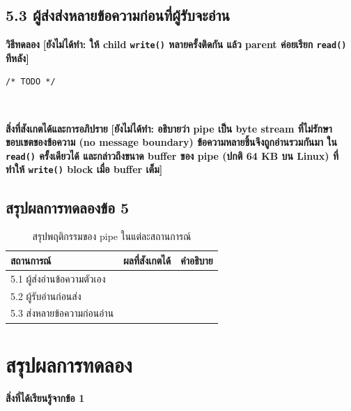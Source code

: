 \documentclass[a4paper,12pt]{article}
\newcommand{\code}[1]{\texttt{#1}}
\newcommand{\todo}[1]{\textcolor{todored}{\textbf{[ยังไม่ได้ทำ: #1]}}}
\begin{document}
\subsection{5.3 ผู้ส่งส่งหลายข้อความก่อนที่ผู้รับจะอ่าน}

\textbf{วิธีทดลอง} \quad \todo{ให้ child \code{write()} หลายครั้งติดกัน
แล้ว parent ค่อยเรียก \code{read()} ทีหลัง}

\begin{lstlisting}[caption={ส่วนของโค้ดที่แก้ไขในข้อ 5.3}]
/* TODO */
\end{lstlisting}

\begin{lstlisting}[style=terminal,caption={ผลลัพธ์ของข้อ 5.3}]


\end{lstlisting}

\textbf{สิ่งที่สังเกตได้และการอภิปราย} \quad \todo{อธิบายว่า pipe เป็น byte stream
ที่ไม่รักษาขอบเขตของข้อความ (no message boundary) ข้อความหลายชิ้นจึงถูกอ่านรวมกันมา
ใน \code{read()} ครั้งเดียวได้ และกล่าวถึงขนาด buffer ของ pipe (ปกติ 64 KB บน Linux)
ที่ทำให้ \code{write()} block เมื่อ buffer เต็ม}

\subsection{สรุปผลการทดลองข้อ 5}

\begin{table}[H]
\centering
\caption{สรุปพฤติกรรมของ pipe ในแต่ละสถานการณ์}
\begin{tabular}{p{4.5cm}p{4cm}p{5cm}}
\toprule
\textbf{สถานการณ์} & \textbf{ผลที่สังเกตได้} & \textbf{คำอธิบาย} \\
\midrule
5.1 ผู้ส่งอ่านข้อความตัวเอง & & \\
5.2 ผู้รับอ่านก่อนส่ง & & \\
5.3 ส่งหลายข้อความก่อนอ่าน & & \\
\bottomrule
\end{tabular}
\end{table}

\newpage
\section*{สรุปผลการทดลอง}

\textbf{สิ่งที่ได้เรียนรู้จากข้อ 1}
\end{document}
